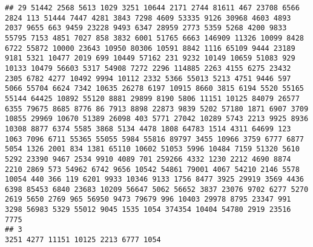 \documentclass{article}\usepackage[]{graphicx}\usepackage[]{color}
\makeatletter
\newenvironment{kframe}{%
 \def\at@end@of@kframe{}%
 \ifinner\ifhmode%
  \def\at@end@of@kframe{\end{minipage}}%
  \begin{minipage}{\columnwidth}%
 \fi\fi%
 \def\FrameCommand##1{\hskip\@totalleftmargin \hskip-\fboxsep
 \colorbox{shadecolor}{##1}\hskip-\fboxsep
     \hskip-\linewidth \hskip-\@totalleftmargin \hskip\columnwidth}%
 \MakeFramed {\advance\hsize-\width
   \@totalleftmargin\z@ \linewidth\hsize
   \@setminipage}}%
 {\par\unskip\endMakeFramed%
 \at@end@of@kframe}
\newenvironment{knitrout}{}{} %
\makeatother
\begin{document}
\begin{knitrout}
\begin{kframe}
\begin{verbatim}
## 29 51442 2568 5613 1029 3251 10644 2171 2744 81611 467 23708 6566 2824 113 51444 7447 4281 3843 7298 4609 53335 9126 30968 4603 4893 2037 9655 663 9459 23228 9493 6347 28959 2773 5359 5268 4200 9833 55795 7153 4851 7027 858 3832 6001 51765 6663 146909 11326 10099 8428 6722 55872 10000 23643 10950 80306 10591 8842 1116 65109 9444 23189 9181 5321 10477 2019 699 10449 57162 231 9232 10149 10659 51083 929 10133 10479 56603 5317 54908 7272 2296 114885 2263 4155 6275 23432 2305 6782 4277 10492 9994 10112 2332 5366 55013 5213 4751 9446 597 5066 55704 6624 7342 10635 26278 6197 10915 8660 3815 6194 5520 55165 55144 64425 10892 55120 8881 29899 8190 5806 11151 10125 84079 26577 6355 79675 8685 8776 86 7913 8898 22873 9839 5202 57180 1871 6907 3709 10855 29969 10670 51389 26098 403 5771 27042 10289 5743 2213 9925 8936 10308 8877 6374 5585 3868 5134 4478 1808 64783 1514 4311 64699 123 1063 7096 6711 55365 55055 5984 55816 89797 3455 10966 3759 6777 6877 5054 1326 2001 834 1381 65110 10602 51053 5996 10484 7159 51320 5610 5292 23390 9467 2534 9910 4089 701 259266 4332 1230 2212 4690 8874 2210 2869 573 54962 6742 9656 10542 54861 79001 4067 54210 2146 5578 10054 440 366 119 6201 9933 10346 9133 1756 8477 3925 29919 3569 4436 6398 85453 6840 23683 10209 56647 5062 56652 3837 23076 9702 6277 5270 2619 5650 2769 965 56950 9473 79679 996 10403 29978 8795 23347 991 3298 56983 5329 55012 9045 1535 1054 374354 10404 54780 2919 23516 7775
## 3                                                                                                                                                                                                                                                                                                                                                                                                                                                                                                                                                                                                                                                                                                                                                                                                                                                                                                                                                                                                                                                                                                                                                                                                                                                                                                                                                                                                                                                            3251 4277 11151 10125 2213 6777 1054

\end{verbatim}
\end{kframe}
\end{knitrout}
\end{document}

